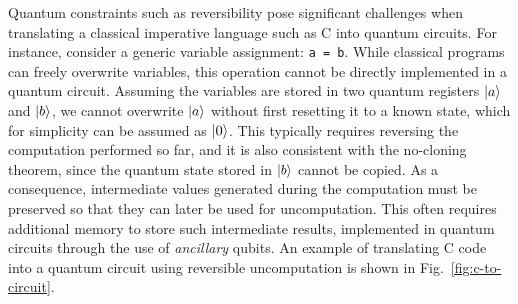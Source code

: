 Quantum constraints such as reversibility pose significant challenges when translating a classical imperative language such as C into quantum circuits. 
For instance, consider a generic variable assignment: \texttt{a = b}. While classical programs can freely overwrite variables, this operation cannot be directly implemented in a quantum circuit. Assuming the variables are stored in two quantum registers $\ket{a}$ and $\ket{b}$, we cannot overwrite $\ket{a}$ without first resetting it to a known state, which for simplicity can be assumed as $\ket{0}$. This typically requires reversing the computation performed so far, and it is also consistent with the no-cloning theorem, since the quantum state stored in $\ket{b}$ cannot be copied.
As a consequence, intermediate values generated during the computation must be preserved so that they can later be used for uncomputation. This often requires additional memory to store such intermediate results, implemented in quantum circuits through the use of \emph{ancillary} qubits. 
An example of translating C code into a quantum circuit using reversible uncomputation is shown in Fig.~\ref{fig:c-to-circuit}.


